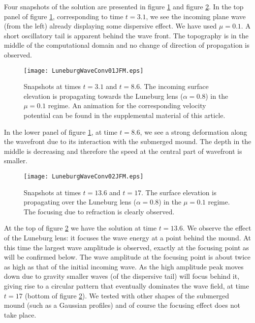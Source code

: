 Four snapshots of the solution are presented in  figure \ref{Fig05} and figure \ref{Fig06}. In the top 
panel of figure \ref{Fig05}, corresponding to time $t = 3.1$, we see the incoming plane wave (from the left)
already displaying some dispersive effect. We have used $\mu = 0.1$.
A short oscillatory tail is apparent behind the wave front. 
The topography is in the middle of the computational domain and  no change of direction of propagation is observed.


\begin{figure}
\centerline{\texttt{[image: LuneburgWaveConv01JFM.eps]}}
\caption{Snapshots  at times $t = 3.1$ and $t=8.6$.  The incoming surface elevation is propagating towards the Luneburg lens 
($\alpha = 0.8$)  in the $\mu = 0.1$ regime. An animation for the corresponding velocity potential can be found in the supplemental material of this article.}
\label{Fig05}
\end{figure}

In the lower panel of figure \ref{Fig05}, at time $t = 8.6$, we see a strong deformation along the wavefront  due to its interaction with the 
submerged mound. The depth in the middle is decreasing and therefore the speed at the central part of wavefront is smaller.

\begin{figure}
\centerline{\texttt{[image: LuneburgWaveConv02JFM.eps]}}
\caption{
Snapshots  at times $t = 13.6$ and $t=17$.  The  surface elevation is propagating over the Luneburg lens 
($\alpha = 0.8$)  in the $\mu = 0.1$ regime. The focusing due to refraction is clearly observed.}
\label{Fig06}
\end{figure}

At the top of figure \ref{Fig06} we have the solution at time $t = 13.6$. We observe the effect of the Luneburg lens: 
it focuses the wave energy at a point behind the mound. 
At this time the largest wave amplitude is observed, exactly at the focusing point as will be confirmed below. 
The wave amplitude at the focusing point is about twice as high as that of the initial incoming wave.
As the high amplitude peak moves down due to gravity  smaller waves (of the dispersive tail) will focus behind it, 
giving rise to a circular pattern that eventually dominates the wave field, at time $t = 17$ (bottom of figure \ref{Fig06}).
We tested with other shapes of the submerged mound (such as a Gaussian profiles) and of course the focusing
effect does not take place. 


